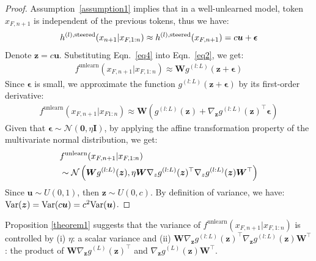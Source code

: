 \documentclass[letterpaper]{article} %
\begin{document}
\begin{proof} Assumption~\ref{assumption1} implies that in a well-unlearned model, token $x_{F,n+1}$ is independent of the previous tokens, thus we have:
\begin{align}h^{(l),\textnormal{steered}}(x_{n+1}|x_{F, 1:n}) \approx h^{(l),\text{steered}}(x_{F,n+1})= c\bm u + \bm \epsilon \label{eq4}
\end{align} 
Denote $\bm z = c\bm u$. Substituting Eqn.~\ref{eq4} into Eqn.~\ref{eq2}, we get:
\begin{align}
{f^{\text{unlearn}}}(x_{F,n+1}|x_{F,1:n}) \approx \bm Wg^{(l:L)}(\bm z + \bm\epsilon)
\end{align}
Since $\bm \epsilon$ is small, we approximate the function $g^{(l:L)}(\bm z + \bm\epsilon)$ by its first-order derivative:
\begin{align}f^{\text{unlearn}}(x_{F,n+1}|x_{F 1:n})\approx \bm W(g^{(l:L)}(\bm z) + \nabla_{\bm z}g^{(l:L)}(\bm z)^{\top}\bm \epsilon)\end{align}
Given that $\bm \epsilon \sim \mathcal{N}(\bm 0, \eta\bm I)$, by applying the affine transformation property of the multivariate normal distribution, we get:
\begin{align}
&f^{\textnormal{unlearn}}(x_{F,n+1}|x_{F,1:n}) \nonumber\\&\sim \mathcal{N}\left(\bm Wg^{(l:L)}(\bm z), \eta\bm W\nabla_{z}g^{(l:L)}(\bm z)^{\top}\nabla_{z}g^{(l:L)}(\bm z) \bm W^{\top}\right)
\end{align}
Since $\bm u \sim U(0,1)$, then $\bm z \sim U(0,c)$.
By definition of variance, we have: $\textnormal{Var}(\bm z) =\textnormal{Var}(c\bm u) = c^2\textnormal{Var}(\bm u)$.
\end{proof}
Proposition \ref{theorem1} suggests that the variance of $f^{\text{unlearn}}(x_{F,n+1}|x_{F,1:n})$ is controlled by (i) $\eta$: a scalar variance and (ii) $\bm W\nabla_{\bm z}g^{(l:L)}(\bm z)^{\top}\nabla_{\bm z}g^{(l:L)}(\bm z)\bm W^{\top}$: the product of $\bm W\nabla_{\bm z}g^{(L)}(\bm z)^{\top}$ and $\nabla_{\bm z}g^{(L)}(\bm z)\bm W^{\top}$.
\end{document}

